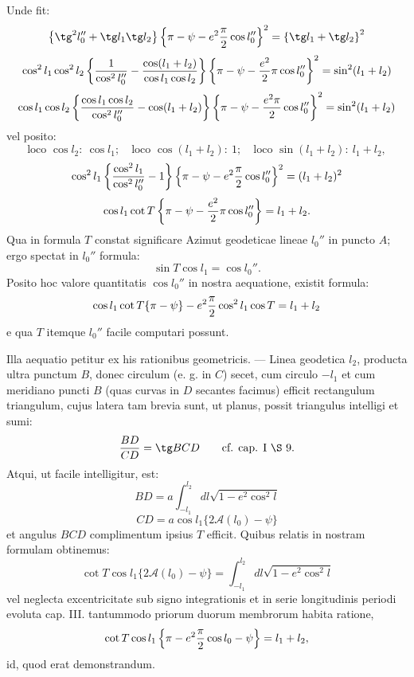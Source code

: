\begingroup\small
Unde fit:
\[
\left\{\tg^2l_0''+\tg l_1\tg l_2\right\}\left\{\pi-\psi-e^2{\pi\over2}\cos l_0''\right\}^2=\left\{\tg l_1+\tg l_2\right\}^2
\]
\[
 \cos^2l_1\cos^2l_2\left\{{1\over\cos^2l_0''}-{\cos(l_1+l_2)\over\cos l_1\cos l_2}\right\}\left\{\pi-\psi-{e^2\over2}\pi\cos l_0''\right\}^2=\sin^2(l_1+l_2)
\]
\[
 \cos l_1\cos l_2\left\{{\cos l_1\cos l_2\over\cos^2l_0''}-\cos(l_1+l_2)\right\}\left\{\pi-\psi-{e^2\pi\over2}\cos l_0''\right\}^2=\sin^2(l_1+l_2)
\]
vel posito:
\[
\text{loco }\cos l_2:\ \cos l_1;\quad \text{loco }\cos(l_1+l_2):\ 1;\quad \text{loco }\sin(l_1+l_2):\ l_1+l_2,
\]
\[
 \cos^2l_1\left\{{\cos^2l_1\over\cos^2l_0''}-1\right\}\left\{\pi-\psi-e^2{\pi\over2}\cos l_0''\right\}^2=(l_1+l_2)^2
\]
\[
 \cos l_1\cot T\left\{\pi-\psi-{e^2\over2}\pi\cos l_0''\right\}=l_1+l_2.
\]
Qua in formula $T$ constat significare Azimut geodeticae lineae $l_0''$ in puncto $A$; ergo spectat in $l_0''$ formula:
\[
 \sin T\cos l_1=\cos l_0''.
\]
Posito hoc valore quantitatis $\cos l_0''$ in nostra aequatione, existit formula:
\[
 \cos l_1\cot T\{\pi-\psi\}-e^2{\pi\over2}\cos^2l_1\cos T=l_1+l_2
\]
e qua $T$ itemque $l_0''$ facile computari possunt.

Illa aequatio petitur ex his rationibus geometricis. --- Linea geodetica $l_2$, producta ultra punctum $B$, donec circulum  (e. g. in $C$) secet, cum circulo $-l_1$ et cum meridiano puncti $B$ (quas curvas in $D$ secantes facimus) efficit rectangulum triangulum, cujus latera tam brevia sunt, ut planus, possit triangulus intelligi et sumi:
\[
 {BD\over CD}=\tg BCD \qquad\text{cf. cap. I \S\ 9.}
\]
Atqui, ut facile intelligitur, est:
\[
 BD=a\int_{-l_1}^{l_2} dl\sqrt{1-e^2\cos^2l}
\]
\[
 CD=a\cos l_1\{2\mathcal A(l_0)-\psi\}
\]
et angulus $BCD$ complimentum ipsius $T$ efficit.
Quibus relatis in nostram formulam obtinemus:
\[
 \cot T\cos l_1\{2\mathcal A(l_0)-\psi\}=\int_{-l_1}^{l_2}dl\sqrt{1-e^2\cos^2l}
\]
vel neglecta excentricitate sub signo integrationis et in serie longitudinis periodi evoluta cap. III. tantummodo priorum duorum membrorum habita ratione,
\[
 \cot T\cos l_1\left\{\pi-e^2{\pi\over2}\cos l_0-\psi\right\}=l_1+l_2,
\]
id, quod erat demonstrandum.
\endgroup
